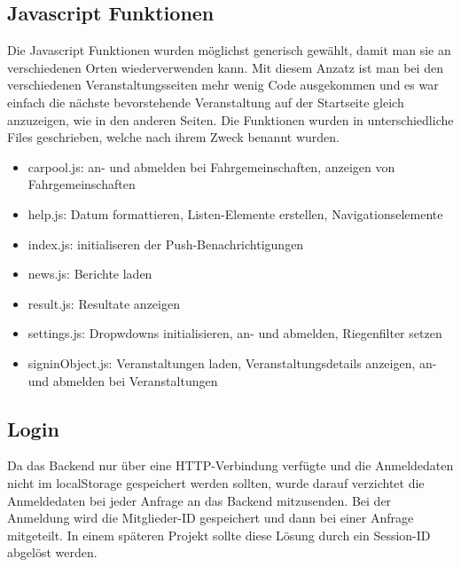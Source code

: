 \newpage
\FloatBarrier
\subsection{Javascript Funktionen}
Die Javascript Funktionen wurden möglichst generisch gewählt, damit man sie an verschiedenen Orten wiederverwenden kann. Mit diesem Anzatz ist man bei den verschiedenen Veranstaltungsseiten mehr wenig Code ausgekommen und es war einfach die nächste bevorstehende Veranstaltung auf der Startseite gleich anzuzeigen, wie in den anderen Seiten. Die Funktionen wurden in unterschiedliche Files geschrieben, welche nach ihrem Zweck benannt wurden.
\begin{itemize}
\item carpool.js: an- und abmelden bei Fahrgemeinschaften, anzeigen von Fahrgemeinschaften
\item help.js:  Datum formattieren,  Listen-Elemente erstellen, Navigationselemente
\item index.js: initialiseren der Push-Benachrichtigungen
\item news.js: Berichte laden
\item result.js: Resultate anzeigen
\item settings.js: Dropwdowns initialisieren, an- und abmelden, Riegenfilter setzen
\item signinObject.js: Veranstaltungen laden, Veranstaltungsdetails anzeigen, an- und abmelden bei Veranstaltungen 
\end{itemize}

\subsection{Login}
Da das Backend nur über eine HTTP-Verbindung verfügte und die Anmeldedaten nicht im localStorage  gespeichert werden sollten, wurde darauf verzichtet die Anmeldedaten bei jeder Anfrage an das Backend mitzusenden. Bei der Anmeldung wird die Mitglieder-ID gespeichert und dann bei einer Anfrage mitgeteilt. In einem späteren Projekt sollte diese Lösung durch ein Session-ID abgelöst werden.

